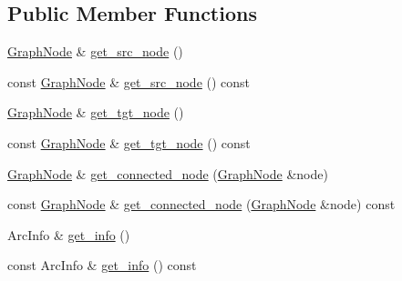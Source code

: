 \subsection*{Public Member Functions}
\begin{DoxyCompactItemize}
\item 
\hyperlink{class_designar_1_1_graph_node}{Graph\+Node} \& \hyperlink{class_designar_1_1_base_graph_arc_ae5bf587f363169ac3cf0de8808410476}{get\+\_\+src\+\_\+node} ()
\item 
const \hyperlink{class_designar_1_1_graph_node}{Graph\+Node} \& \hyperlink{class_designar_1_1_base_graph_arc_abf7c4174301f972969bc11e9154a353a}{get\+\_\+src\+\_\+node} () const
\item 
\hyperlink{class_designar_1_1_graph_node}{Graph\+Node} \& \hyperlink{class_designar_1_1_base_graph_arc_a2fe944d9d98fd2451d0c82fa0e805bce}{get\+\_\+tgt\+\_\+node} ()
\item 
const \hyperlink{class_designar_1_1_graph_node}{Graph\+Node} \& \hyperlink{class_designar_1_1_base_graph_arc_aecf3b0b06c1019563d433d44e922775b}{get\+\_\+tgt\+\_\+node} () const
\item 
\hyperlink{class_designar_1_1_graph_node}{Graph\+Node} \& \hyperlink{class_designar_1_1_base_graph_arc_a756bd68ff9797ff54b53657c2a39730c}{get\+\_\+connected\+\_\+node} (\hyperlink{class_designar_1_1_graph_node}{Graph\+Node} \&node)
\item 
const \hyperlink{class_designar_1_1_graph_node}{Graph\+Node} \& \hyperlink{class_designar_1_1_base_graph_arc_a5e8a913b9632b653908d054a7e277d7a}{get\+\_\+connected\+\_\+node} (\hyperlink{class_designar_1_1_graph_node}{Graph\+Node} \&node) const
\item 
Arc\+Info \& \hyperlink{class_designar_1_1_base_graph_arc_a90c613c982dec0d38acd6051c26a5562}{get\+\_\+info} ()
\item 
const Arc\+Info \& \hyperlink{class_designar_1_1_base_graph_arc_a90dce6365bbeef65a6ff5fa343b27710}{get\+\_\+info} () const
\end{DoxyCompactItemize}
